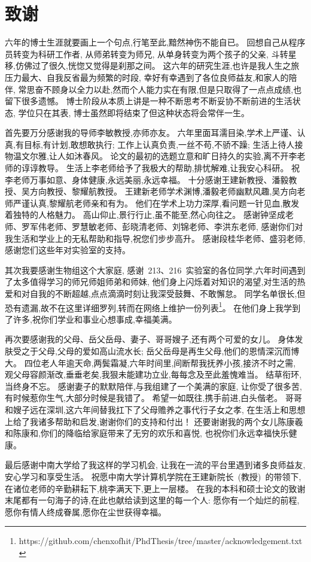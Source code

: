 \section{致谢} %

六年的博士生涯就要画上一个句点,行笔至此,黯然神伤不能自已。
回想自己从程序员转变为科研工作者,
从师弟转变为师兄,
从单身转变为两个孩子的父亲,
斗转星移,仿佛过了很久,恍惚又觉得是刹那之间。
这六年的研究生涯,也许是我人生之旅压力最大、自我反省最为频繁的时段,
幸好有幸遇到了各位良师益友,和家人的陪伴,
常思奋不顾身以全力以赴,然而个人能力实在有限,但是只取得了一点点成绩,也留下很多遗憾。
博士阶段从本质上讲是一种不断思考不断妥协不断前进的生活状态,
学位只在其表,
博士虽然即将结束了但这种状态将会常伴一生。

首先要万分感谢我的导师李敏教授,亦师亦友。
六年里面耳濡目染,学术上严谨、认真,有目标,有计划,敢想敢执行;
工作上认真负责,一丝不苟,不骄不躁;
生活上待人接物温文尔雅,让人如沐春风。
论文的最初的选题立意和旷日持久的实验,离不开李老师的谆谆教导。
生活上李老师给予了我极大的帮助,排忧解难,让我安心科研。
祝李老师万事如意、身体健康,永远美丽,永远幸福。
十分感谢王建新教授、潘毅教授、吴方向教授、黎耀航教授。
王建新老师学术渊博,潘毅老师幽默风趣,吴方向老师严谨认真,黎耀航老师亲和有为。
他们在学术上功力深厚,看问题一针见血,散发着独特的人格魅力。
高山仰止,景行行止,虽不能至,然心向往之。
感谢钟坚成老师、罗军伟老师、罗慧敏老师、彭晓清老师、刘锦老师、李洪东老师,
感谢你们对我生活和学业上的无私帮助和指导,祝您们步步高升。
感谢段桂华老师、盛羽老师,感谢您们这些年对实验室的支持。

其次我要感谢生物组这个大家庭,
感谢~213、216~实验室的各位同学,六年时间遇到了太多值得学习的师兄师姐师弟和师妹,
他们身上闪烁着对知识的渴望,对生活的热爱和对自我的不断超越,点点滴滴时刻让我深受鼓舞、不敢懈怠。
同学名单很长,但恐有遗漏,故不在这里详细罗列,转而在网络上维护一份列表\footnote{https://github.com/chenxofhit/PhdThesis/tree/master/acknowledgement.txt}。
在他们身上我学到了许多,祝你们学业和事业心想事成,幸福美满。

再次要感谢我的父母、岳父岳母、妻子、哥哥嫂子,还有两个可爱的女儿。
身体发肤受之于父母,父母的爱如高山流水长;
岳父岳母是再生父母,他们的恩情深沉而博大。
四位老人年逾天命,两鬓霜凝,六年时间里,间断帮我抚养小孩,接济不时之需,
观父母容颜渐改,垂垂老矣,我狠未能建功立业,每每念及至此羞愧难当。
结草衔环,当终身不忘。
感谢妻子的默默陪伴,与我组建了一个美满的家庭,
让你受了很多苦,有时候惹你生气,大部分时候是我错了。
希望一如既往,携手前进,白头偕老。
哥哥和嫂子远在深圳,这六年间替我扛下了父母赡养之事代行子女之孝,
在生活上和思想上给了我诸多帮助和启发,谢谢你们的支持和付出！
还要谢谢我的两个女儿陈康羲和陈康和,你们的降临给家庭带来了无穷的欢乐和喜悦,
也祝你们永远幸福快乐健康。

最后感谢中南大学给了我这样的学习机会, 
让我在一流的平台里遇到诸多良师益友,
安心学习和享受生活。
祝愿中南大学计算机学院在王建新院长~(教授)~的带领下, 
在诸位老师的辛勤耕耘下,桃李满天下,更上一层楼。
在我的本科和硕士论文的致谢末尾都有一句海子的诗,在此也献给读到这里的每一个人:
愿你有一个灿烂的前程,愿你有情人终成眷属,愿你在尘世获得幸福。